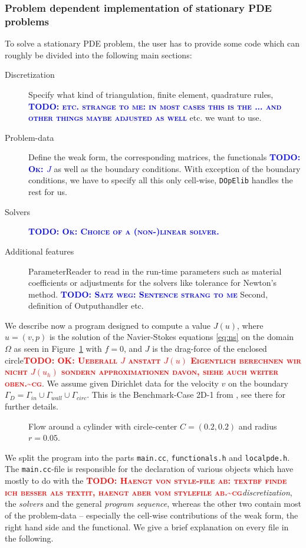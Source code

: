 \documentclass[prodmode,acmtoms]{acmsmall}
\numberwithin{equation}{section}
\newcommand{\dope}{\texttt{DOpElib}}
\newcommand{\todo}[1]{\textbf{\textsc{\textcolor{blue}{TODO: #1}}}}
\newcommand{\todocg}[1]{\textbf{\textsc{\textcolor{red}{TODO: #1\textasciitilde cg}}}}
\begin{document}
\subsubsection{Problem dependent implementation of stationary PDE problems}
To solve a stationary PDE problem, the user has to provide some code which can roughly be divided into the following main sections:
\begin{description}
\item[Discretization] Specify what kind of triangulation,
finite element, quadrature rules, 
\todo{etc. strange to me: in most cases this is the 
... and other things maybe adjusted as well} etc. we want to use.
\item[Problem-data] 
Define the weak form, 
the corresponding matrices, 
the functionals \todo{Ok: $J$} as well as the boundary conditions. With exception of the boundary conditions, we have to specify all this only cell-wise, \dope{} handles the rest for us.
\item[Solvers] \todo{Ok: Choice of a (non-)linear solver.}
\item[Additional features] ParameterReader to read in the run-time parameters
  such as material coefficients or adjustments for the solvers like tolerance
  for Newton's method. 
\todo{Satz weg: Sentence strang to me} Second, definition of Outputhandler etc.
\end{description} 

We describe now a program designed to compute a value $J(u)$, where $u=(v,p)$
is the solution of the Navier-Stokes equations \eqref{eq:ns} on the domain
$\Omega$ as seen in Figure~\ref{fig:example_ns} with  $f=0$, and $J$ is the
drag-force of the enclosed circle\todocg{OK: Ueberall $J$ anstatt $J(u)$ Eigentlich berechnen wir nicht $J(u_h)$ sondern approximationen davon, siehe auch weiter oben.}. We assume given Dirichlet data for the velocity $v$ on the boundary $\Gamma_{D}=\Gamma_{in}\cup\Gamma_{wall}\cup\Gamma_{circ}$. This is the Benchmark-Case 2D-1 from \cite{TuSchae96}, see there for further details.
\begin{figure}[h]
\centering
\resizebox{0.5\textwidth}{!}{}
\caption{Flow around a cylinder with 
circle-center $C=(0.2,0.2)$ and radius $r=0.05$.}
\label{fig:example_ns}
\end{figure}
We split the program into the parts \texttt{main.cc}, \texttt{functionals.h}
and \texttt{localpde.h}. The \texttt{main.cc}-file is responsible for the
declaration of various objects which have mostly to do with the \todocg{Haengt
  von style-file ab: textbf finde ich besser als textit, haengt aber vom stylefile ab.}\textit{discretization}, the \textit{solvers} and the general \textit{program sequence}, whereas the other two contain most of the problem-data -- especially the cell-wise contributions of the weak form, the right hand side and the functional. We give a brief explanation on every file in the following.
\end{document}
